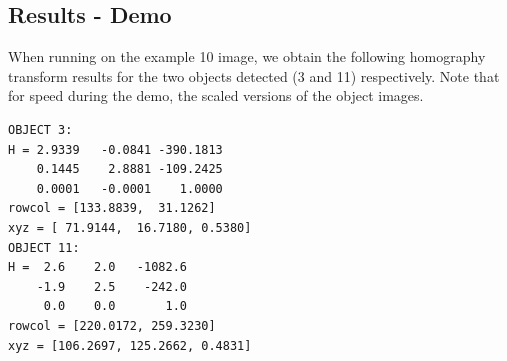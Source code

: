 \documentclass[10pt, titlepage, onecolumn, fleqn]{article}
\begin{document}
\subsection{Results - Demo}
When running on the example 10 image, we obtain the following homography transform results for the two objects detected (3 and 11) respectively. Note that for speed during the demo, the scaled versions of the object images.
\begin{verbatim}
OBJECT 3:
H = 2.9339   -0.0841 -390.1813
    0.1445    2.8881 -109.2425
    0.0001   -0.0001    1.0000
rowcol = [133.8839,  31.1262]
xyz = [ 71.9144,  16.7180, 0.5380]
OBJECT 11:
H =  2.6    2.0   -1082.6
    -1.9    2.5    -242.0
     0.0    0.0       1.0
rowcol = [220.0172, 259.3230]
xyz = [106.2697, 125.2662, 0.4831]
\end{verbatim}
\end{document}
